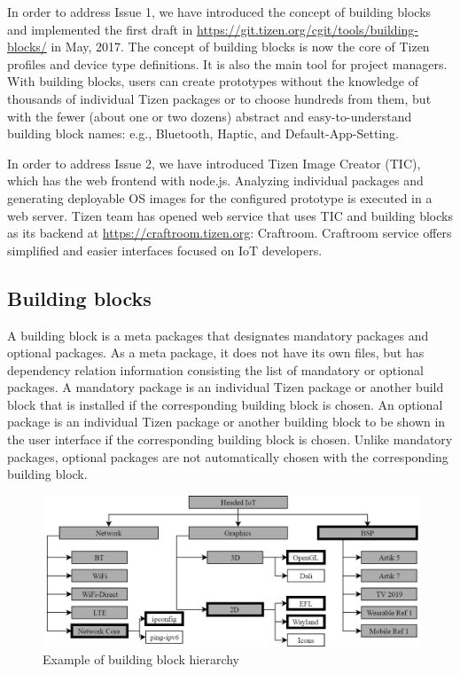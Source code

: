 In order to address Issue 1, we have introduced the concept of building blocks and implemented the first draft in \url{https://git.tizen.org/cgit/tools/building-blocks/} in May, 2017.
The concept of building blocks is now the core of Tizen profiles and device type definitions.
It is also the main tool for project managers.
With building blocks, users can create prototypes without the knowledge of thousands of individual Tizen packages or to choose hundreds from them, but with the fewer (about one or two dozens) abstract and easy-to-understand building block names: e.g., Bluetooth, Haptic, and Default-App-Setting.


In order to address Issue 2, we have introduced Tizen Image Creator (TIC), which has the web frontend with node.js.
Analyzing individual packages and generating deployable OS images for the configured prototype is executed in a web server.
Tizen team has opened web service that uses TIC and building blocks as its backend at \url{https://craftroom.tizen.org}: Craftroom.
Craftroom service offers simplified and easier interfaces focused on IoT developers.


\subsection{Building blocks}\label{SS_buildingblocks}

A building block is a meta packages that designates mandatory packages and optional packages.
As a meta package, it does not have its own files, but has dependency relation information consisting the list of mandatory or optional packages.
A mandatory package is an individual Tizen package or another build block that is installed if the corresponding building block is chosen.
An optional package is an individual Tizen package or another building block to be shown in the user interface if the corresponding building block is chosen.
Unlike mandatory packages, optional packages are not automatically chosen with the corresponding building block.


\begin{figure}
\includegraphics[width=0.95\columnwidth]{figures/BBExample.png}
\caption{Example of building block hierarchy}
\label{FIG_TZN_BBHier}
\end{figure}


